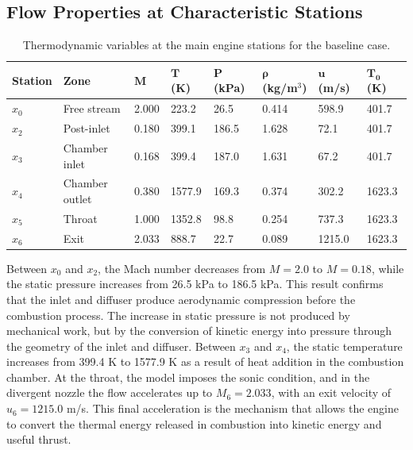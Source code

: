 \documentclass[preprint,12pt]{elsarticle}
\begin{document}
\subsection{Flow Properties at Characteristic Stations}
\begin{table}[H]
\centering
\caption{Thermodynamic variables at the main engine stations for the baseline case.}
\label{tab:station_properties}
\begin{tabular}{llllllll}
\toprule
\textbf{Station} & \textbf{Zone} & $\mathbf{M}$ & $\mathbf{T}$ \textbf{(K)} & $\mathbf{P}$ \textbf{(kPa)} & $\boldsymbol{\rho}$ \textbf{(kg/m$^3$)} & $\mathbf{u}$ \textbf{(m/s)} & $\mathbf{T_0}$ \textbf{(K)} \\
\midrule
$x_0$ & Free stream & 2.000 & 223.2 & 26.5 & 0.414 & 598.9 & 401.7 \\
$x_2$ & Post-inlet & 0.180 & 399.1 & 186.5 & 1.628 & 72.1 & 401.7 \\
$x_3$ & Chamber inlet & 0.168 & 399.4 & 187.0 & 1.631 & 67.2 & 401.7 \\
$x_4$ & Chamber outlet & 0.380 & 1577.9 & 169.3 & 0.374 & 302.2 & 1623.3 \\
$x_5$ & Throat & 1.000 & 1352.8 & 98.8 & 0.254 & 737.3 & 1623.3 \\
$x_6$ & Exit & 2.033 & 888.7 & 22.7 & 0.089 & 1215.0 & 1623.3 \\
\bottomrule
\end{tabular}
\end{table}
Between $x_0$ and $x_2$, the Mach number decreases from $M=2.0$ to $M=0.18$, while the static pressure increases from 26.5 kPa to 186.5 kPa. This result confirms that the inlet and diffuser produce aerodynamic compression before the combustion process. The increase in static pressure is not produced by mechanical work, but by the conversion of kinetic energy into pressure through the geometry of the inlet and diffuser.
Between $x_3$ and $x_4$, the static temperature increases from 399.4 K to 1577.9 K as a result of heat addition in the combustion chamber. At the throat, the model imposes the sonic condition, and in the divergent nozzle the flow accelerates up to $M_6=2.033$, with an exit velocity of $u_6=1215.0$ m/s. This final acceleration is the mechanism that allows the engine to convert the thermal energy released in combustion into kinetic energy and useful thrust.
\end{document}
